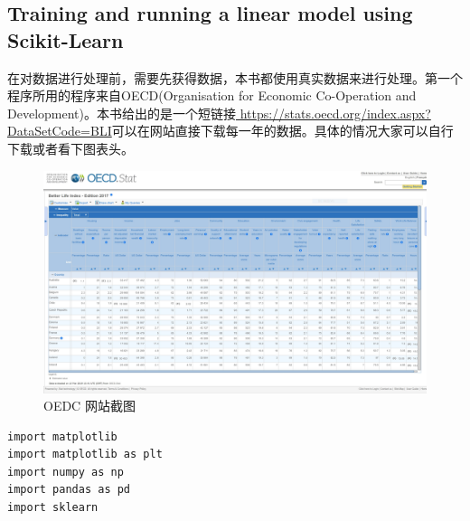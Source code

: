 \documentclass[UTF8]{ctexart}
\begin{document}
\subsection{Training and running a linear model using Scikit-Learn}
在对数据进行处理前，需要先获得数据，本书都使用真实数据来进行处理。第一个程序所用的程序来自OECD(Organisation for Economic Co-Operation and Development)。本书给出的是一个短链接\url{ https://stats.oecd.org/index.aspx?DataSetCode=BLI}可以在网站直接下载每一年的数据。具体的情况大家可以自行下载或者看下图表头。
\begin{figure}[H]
\centering
\includegraphics[width = 6in]{oedc.jpg}
\caption{OEDC 网站截图}
\end{figure}


\begin{lstlisting}
import matplotlib
import matplotlib as plt
import numpy as np
import pandas as pd
import sklearn


\end{lstlisting}
\end{document}
